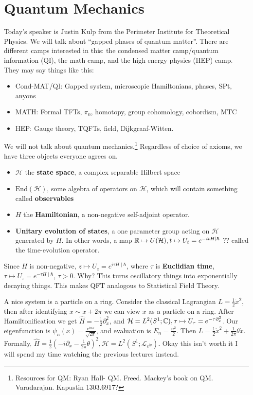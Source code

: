 \section{Quantum Mechanics} 
Today's speaker is Justin Kulp from the Perimeter Institute for Theoretical Physics. We will talk about ``gapped phases of quantum matter''. There are different camps interested in this: the condensed matter camp/quantum information (QI), the math camp, and the high energy physics (HEP) camp. They may say things like this:
\begin{itemize}
\setlength\itemsep{-.2em}
    \item Cond-MAT/QI: Gapped system, microscopic Hamiltonians, phases, SPt, anyons
    \item MATH: Formal TFTs, $\pi_0$, homotopy, group cohomology, cobordism, MTC
    \item HEP: Gauge theory, TQFTs, field, Dijkgraaf-Witten.
\end{itemize}
We will not talk about quantum mechanics.\footnote{Resources for QM: Ryan Hall- QM. Freed. Mackey's book on QM. Varadarajan. Kapustin 1303.6917?} Regardless of choice of axioms, we have three objects everyone agrees on.
\begin{itemize}
\setlength\itemsep{-.2em}
    \item $\mathcal{H} $ the \textbf{state space}, a complex separable Hilbert space
    \item $\mathrm{End}(\mathcal{H} )$, some algebra of operators on $\mathcal{H} $, which will contain something called \textbf{observables} 
    \item $H$ the \textbf{Hamiltonian}, a non-negative self-adjoint operator.
    \item \textbf{Unitary evolution of states}, a one parameter group acting on $\mathcal{H} $ generated by $H$. In other words, a map $\mathbb{R} \mapsto U(\mathcal{H} ), t \mapsto U_t= e^{-it H \mid  \hbar}$ ?? called the time-evolution operator.
\end{itemize}Since $H$ is non-negative, $z \mapsto  U_z = e ^{i \tau H \mid  \hbar}$, where $\tau$ is \textbf{Euclidian time}, $\tau \mapsto U_{\tau}=e^{-\tau H \mid \hbar}$, $\tau>0$. Why? This turns oscillatory things into exponentially decaying things. This makes QFT analogous to Statistical Field Theory.

\begin{example}
    A nice system is a particle on a ring. Consider the classical Lagrangian $L=\frac{1}{2}\dot x^2$, then after identifying $x\sim x+2\pi$ we can view $x$ as a particle on a ring. After Hamiltonification we get $\hat{H}=- \frac{1}{2}\partial _x^2$, and $\mathcal{H} =L^2(S^1 ;\mathbb{C}), \tau \mapsto  U _{\tau}=e^{-\tau \partial ^2_x}$. Our eigenfunction is $\psi _n (x)= \frac{e^{inx}}{\sqrt{2 \pi} }$, and evaluation is $E_n = \frac{n^2}{2}$. Then $L= \frac{1}{2}\dot x^2+ \frac{1}{2 \pi}\theta \dot x$. Formally, $\hat{H}= \frac{1}{2}\left( -i \partial _x- \frac{1}{2\pi}\theta \right) ^2,\mathcal{H} =L^2(S^1 ;\mathcal{L} _{e^{i\theta}})$. Okay this isn't worth it I will spend my time watching the previous lectures instead.
\end{example}

